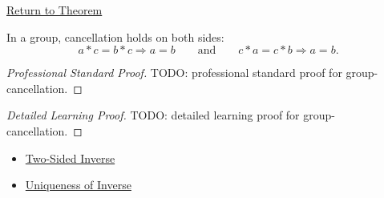 \newpage
{}
\label{prf:group-cancellation}

\begin{remark*}[Return]
\hyperref[thm:group-cancellation]{Return to Theorem}
\end{remark*}

\begin{theorem*}
In a group, cancellation holds on both sides:
\[
a\ast c=b\ast c\Longrightarrow a=b
\qquad\text{and}\qquad
c\ast a=c\ast b\Longrightarrow a=b.
\]
\end{theorem*}

\begin{proof}[Professional Standard Proof]
\LRAProofBodyStart
TODO: professional standard proof for group-cancellation.
\end{proof}

\begin{proof}[Detailed Learning Proof]
\LRAProofBodyStart
TODO: detailed learning proof for group-cancellation.
\end{proof}

\begin{remark*}
\end{remark*}

\begin{dependencies}
\begin{itemize}
  \item \hyperref[def:two-sided-inverse]{Two-Sided Inverse}
  \item \hyperref[thm:uniqueness-of-inverse]{Uniqueness of Inverse}
\end{itemize}
\end{dependencies}

\clearpage
